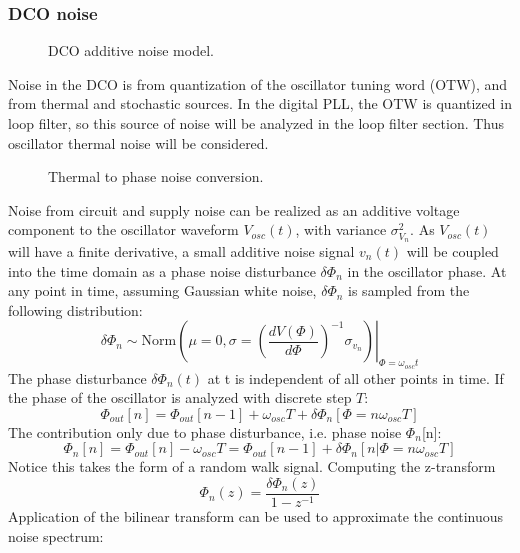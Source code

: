 \subsubsection{DCO noise}
\begin{figure}[htb!]
	\center
	\caption{DCO additive noise model.}
	\label{fig:quantization}
\end{figure}
\FloatBarrier
Noise in the DCO is from quantization of the oscillator tuning word (OTW), and from thermal and stochastic sources. In the digital PLL, the OTW is quantized in loop filter, so this source of noise will be analyzed in the loop filter section. Thus oscillator thermal noise will be considered.
\begin{figure}[htb!]
	\center
	\caption{Thermal to phase noise conversion.}
	\label{fig:quantization}
\end{figure}
\FloatBarrier
 Noise from circuit and supply noise can be realized as an additive voltage component to the oscillator waveform $V_{osc}(t)$, with variance $\sigma_{V_n}^2$. As $V_{osc}(t)$ will have a finite derivative, a small additive noise signal $v_{n}(t)$ will be coupled into the time domain as a phase noise disturbance $\delta\Phi_{n}$ in the oscillator phase. At any point in time, assuming Gaussian white noise, $\delta\Phi_{n}$ is sampled from the following distribution:
 \begin{equation}
 \delta\Phi_{n} \sim \left.\text{Norm}\left(\mu=0, \sigma=\left(\frac{dV(\Phi)}{d\Phi}\right)^{-1}\sigma_{v_n}\right)\right\vert_{\Phi=\omega_{osc}t}
 \end{equation} 
The phase disturbance $\delta\Phi_{n}(t)$ at t is independent of all other points in time. If the phase of the oscillator is analyzed with discrete step $T$:
\begin{equation}
\Phi_{out}[n] = \Phi_{out}[n-1] + \omega_{osc}T + \delta\Phi_n[\Phi=n\omega_{osc} T]
\end{equation}
The contribution only due to phase disturbance, i.e. phase noise $\Phi_n$[n]:
\begin{equation}
\Phi_{n}[n] = \Phi_{out}[n] - \omega_{osc}T = \Phi_{out}[n-1] + \delta\Phi_n[n|\Phi=n\omega_{osc}T]
\end{equation}
Notice this takes the form of a random walk signal. Computing the z-transform
\begin{equation}
\Phi_{n}(z) = \frac{\delta\Phi_n(z)}{1-z^{-1}}
\end{equation}
Application of the bilinear transform can be used to approximate the continuous noise spectrum:
